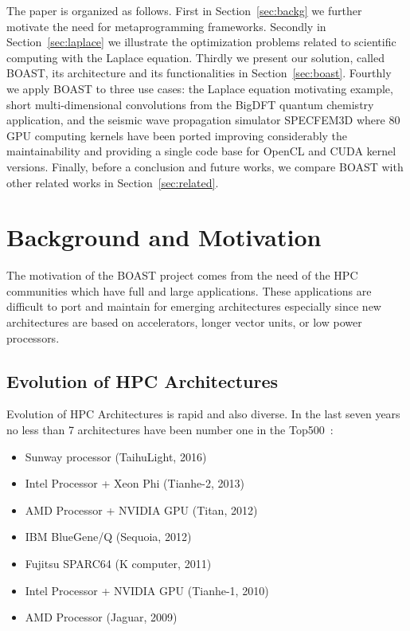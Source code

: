 \documentclass{IEEEtran}
\begin{document}
The paper is organized as follows. First in Section~\ref{sec:backg} we further
motivate the need for metaprogramming frameworks.  Secondly in
Section~\ref{sec:laplace} we illustrate the optimization problems related to
scientific computing with the Laplace equation. Thirdly we present our
solution, called BOAST, its architecture and its functionalities in
Section~\ref{sec:boast}. Fourthly we apply BOAST to three use cases: the
Laplace equation motivating example, short multi-dimensional convolutions from
the BigDFT quantum chemistry application, and the seismic wave propagation
simulator SPECFEM3D where 80 GPU computing kernels have been ported improving
considerably the maintainability and providing a single code base for OpenCL
and CUDA kernel versions. Finally, before a conclusion and future works, we
compare BOAST with other related works in Section~\ref{sec:related}.
 
\section{Background and Motivation\label{sec:backg}}

The motivation of the BOAST project comes from the need of the HPC communities
which have full and large applications.  These applications are difficult to
port and maintain for emerging architectures especially since new architectures
are based on accelerators, longer vector units, or low power processors.

\subsection{Evolution of HPC Architectures}

Evolution of HPC Architectures is rapid and also diverse. In the last seven
years no less than 7 architectures have been number one in the
Top500~\cite{webtop500}:
\begin{itemize}
\item Sunway processor (TaihuLight, 2016)
\item Intel Processor + Xeon Phi (Tianhe-2, 2013)
\item AMD Processor + NVIDIA GPU (Titan, 2012)
\item IBM BlueGene/Q (Sequoia, 2012)
\item Fujitsu SPARC64 (K computer, 2011)
\item Intel Processor + NVIDIA GPU (Tianhe-1, 2010)
\item AMD Processor (Jaguar, 2009)
\end{itemize}
\end{document}
